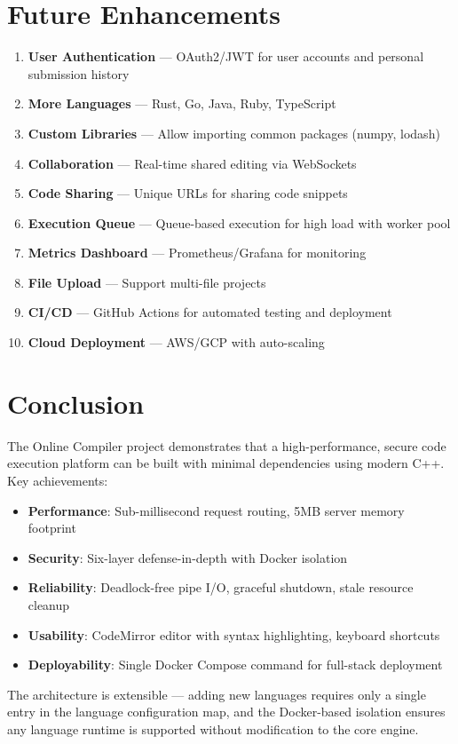 \documentclass[12pt,a4paper]{report}
\begin{document}
\chapter{Future Enhancements}

\begin{enumerate}
    \item \textbf{User Authentication} --- OAuth2/JWT for user accounts and personal submission history
    \item \textbf{More Languages} --- Rust, Go, Java, Ruby, TypeScript
    \item \textbf{Custom Libraries} --- Allow importing common packages (numpy, lodash)
    \item \textbf{Collaboration} --- Real-time shared editing via WebSockets
    \item \textbf{Code Sharing} --- Unique URLs for sharing code snippets
    \item \textbf{Execution Queue} --- Queue-based execution for high load with worker pool
    \item \textbf{Metrics Dashboard} --- Prometheus/Grafana for monitoring
    \item \textbf{File Upload} --- Support multi-file projects
    \item \textbf{CI/CD} --- GitHub Actions for automated testing and deployment
    \item \textbf{Cloud Deployment} --- AWS/GCP with auto-scaling
\end{enumerate}

\chapter{Conclusion}

The Online Compiler project demonstrates that a high-performance, secure code execution platform can be built with minimal dependencies using modern C++. Key achievements:

\begin{itemize}
    \item \textbf{Performance}: Sub-millisecond request routing, 5MB server memory footprint
    \item \textbf{Security}: Six-layer defense-in-depth with Docker isolation
    \item \textbf{Reliability}: Deadlock-free pipe I/O, graceful shutdown, stale resource cleanup
    \item \textbf{Usability}: CodeMirror editor with syntax highlighting, keyboard shortcuts
    \item \textbf{Deployability}: Single Docker Compose command for full-stack deployment
\end{itemize}

The architecture is extensible --- adding new languages requires only a single entry in the language configuration map, and the Docker-based isolation ensures any language runtime is supported without modification to the core engine.
\end{document}
